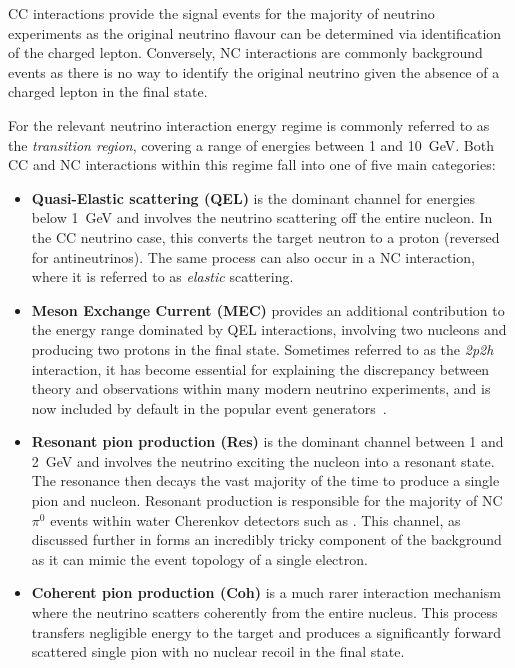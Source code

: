CC interactions provide the signal events for the majority of neutrino experiments as the original
neutrino flavour can be determined via identification of the charged lepton. Conversely, NC
interactions are commonly background events as there is no way to identify the original neutrino
given the absence of a charged lepton in the final state.

For \chips the relevant neutrino interaction energy regime is commonly referred to as the
\emph{transition region}, covering a range of energies between 1 and \SI{10}{\GeV}. Both CC and NC
interactions within this regime fall into one of five main categories:
\begin{itemize}
    \item \textbf{Quasi-Elastic scattering (QEL)} is the dominant channel for energies below
          \SI{1}{\GeV} and involves the neutrino scattering off the entire nucleon. In the CC
          neutrino case, this converts the target neutron to a proton (reversed for
          antineutrinos). The same process can also occur in a NC interaction, where it is
          referred to as \emph{elastic} scattering.

    \item \textbf{Meson Exchange Current (MEC)} provides an additional contribution to the energy
          range dominated by QEL interactions, involving two nucleons and producing two protons in
          the final state. Sometimes referred to as the \emph{2p2h} interaction, it has become
          essential for explaining the discrepancy between theory and observations within many
          modern neutrino experiments, and is now included by default in the popular event
          generators~\cite{katori2013}.

    \item \textbf{Resonant pion production (Res)} is the dominant channel between 1 and
          \SI{2}{\GeV} and involves the neutrino exciting the nucleon into a resonant state. The
          resonance then decays the vast majority of the time to produce a single pion and
          nucleon. Resonant production is responsible for the majority of NC $\pi^{0}$ events
          within water Cherenkov detectors such as \chips. This channel, as discussed further in
           forms an incredibly tricky component of the
          background as it can mimic the event topology of a single electron.

    \item \textbf{Coherent pion production (Coh)} is a much rarer interaction mechanism where the
          neutrino scatters coherently from the entire nucleus. This process transfers negligible
          energy to the target and produces a significantly forward scattered single pion with no
          nuclear recoil in the final state.


\end{itemize}
